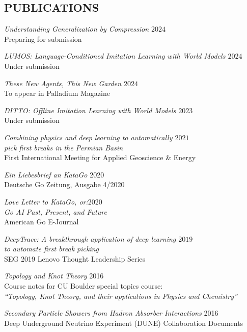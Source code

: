 \documentclass[margin]{res}
\begin{document}
\begin{resume}
                 \section{PUBLICATIONS}

                 {\sl Understanding Generalization by Compression \hfill $2024$}\\
                 Preparing for submission

                 {\sl LUMOS: Language-Conditioned Imitation Learning with World Models \hfill $2024$}\\
                 Under submission

                 {\sl These New Agents, This New Garden \hfill            $2024$}\\
		         To appear in Palladium Magazine

                 {\sl DITTO: Offline Imitation Learning with World Models \hfill            $2023$}\\
		         Under submission

                 {\sl Combining physics and deep learning to automatically \hfill            $2021$ \\ pick first breaks in the Permian Basin} \\
		First International Meeting for Applied Geoscience \& Energy

                {\sl Ein Liebesbrief an KataGo} \hfill 2020 \\
                Deutsche Go Zeitung, Ausgabe 4/2020

                {\sl Love Letter to KataGo, or:\hfill $2020$\\ Go AI Past, Present, and Future} \\
                American Go E-Journal

                {\sl DeepTrace: A breakthrough application of deep learning \hfill $2019$\\ to automate first break picking}  \\
                SEG 2019 Lenovo Thought Leadership Series

                {\sl Topology and Knot Theory} \hfill 2016 \\
                Course notes for CU Boulder special topics course: \\
                \textit{``Topology, Knot Theory, and their applications in Physics and Chemistry''}

                {\sl Secondary Particle Showers from Hadron Absorber Interactions} \hfill 2016 \\
                Deep Underground Neutrino Experiment (DUNE) Collaboration Documents



\end{resume}
\end{document}

